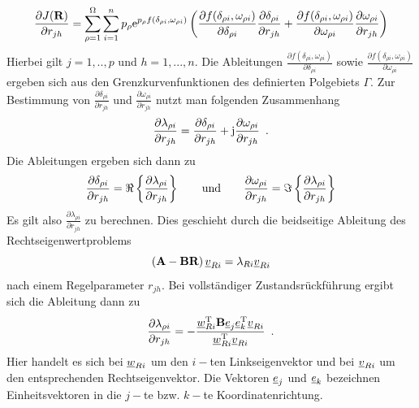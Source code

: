 \begin{equation}
	\frac{\partial J(\textbf{R})}{\partial r_{jh}} = \sum_{\rho = 1}^{\Omega} \sum_{i=1}^{n}
	p_\rho \mathrm{e}^{p_\rho f\left(\delta_{\rho i} ,\omega_{\rho i}\right)}
	\left(
	\frac{\partial f(\delta_{\rho i} ,\omega_{\rho i})}{\partial \delta_{\rho i}}
	\frac{\partial \delta_{\rho i} }{\partial r_{jh}} +
	\frac{\partial f(\delta_{\rho i} ,\omega_{\rho i})}{\partial \omega_{\rho i}}
	\frac{\partial \omega_{\rho i}}{\partial r_{jh}}
	\right)
\end{equation}
Hierbei gilt $j = 1,..,p$ und $h = 1,...,n$. Die Ableitungen $\frac{\partial f(\delta_{\rho i} ,\omega_{\rho i})}{\partial \delta_{\rho i}}$ sowie $	\frac{\partial f(\delta_{\rho i} ,\omega_{\rho i})}{\partial \omega_{\rho i}}$ ergeben sich aus den Grenzkurvenfunktionen des definierten Polgebiets $\Gamma$.
Zur Bestimmung von $\frac{\partial \delta_{\rho i} }{\partial r_{jh}} $ und $\frac{\partial \omega_{\rho i}}{\partial r_{jh}}$ nutzt man folgenden Zusammenhang
\begin{equation}
	\frac{\partial \lambda_{\rho i} }{\partial r_{jh}} = 	
	\frac{\partial \delta_{\rho i} }{\partial r_{jh}} +
	\textnormal{j}\frac{\partial \omega_{\rho i}}{\partial r_{jh}}
	\, \, \, .
\end{equation}
Die Ableitungen ergeben sich dann zu 
\begin{equation}
		\frac{\partial \delta_{\rho i} }{\partial r_{jh}} = \Re\left\{ \frac{\partial \lambda_{\rho i} }{\partial r_{jh}}  \right\}
		\qquad \textnormal{und} \qquad
		\frac{\partial \omega_{\rho i}}{\partial r_{jh}} = \Im\left\{ \frac{\partial \lambda_{\rho i} }{\partial r_{jh}} \right\}
\end{equation}
Es gilt also $\frac{\partial \lambda_{\rho i} }{\partial r_{jh}}$ zu berechnen. Dies geschieht durch die beidseitige Ableitung des Rechtseigenwertproblems 
\begin{equation}
	\left( \textbf{A} - \textbf{B}\textbf{R} \right)\underline{v}_{R i} = \lambda_{R i}\underline{v}_{R i}
\end{equation}
nach einem Regelparameter $r_{jh}$. Bei vollständiger Zustandsrückführung ergibt sich die Ableitung dann zu
\begin{equation}\label{eq:AblLambdaR}
	\frac{\partial \lambda_{\rho i} }{\partial r_{jh}} = 
	- \frac{\underline{w}^{\textnormal{T}}_{R i} \textbf{B} \underline{e}_{j} \underline{e}^{\textnormal{T}}_k \underline{v}_{R i} }
		   {\underline{w}^{\textnormal{T}}_{R i}  \underline{v}_{R i}}
	\, \, \, .
\end{equation}
Hier handelt es sich bei $\underline{w}_{R i}$ um den $i-$ten Linkseigenvektor und bei $ \underline{v}_{R i}$ um den entsprechenden Rechtseigenvektor. Die Vektoren $\underline{e}_{j}$ und $\underline{e}_{k}$ bezeichnen Einheitsvektoren in die $j-$te bzw. $k-$te Koordinatenrichtung.

